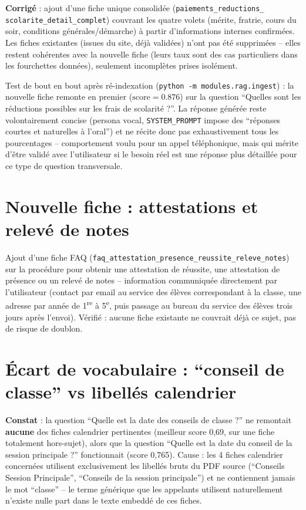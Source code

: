\documentclass[11pt,a4paper]{report}
\begin{document}
\textbf{Corrigé} : ajout d'une fiche unique consolidée (\texttt{paiements\_reductions\_}
\texttt{scolarite\_detail\_complet}) couvrant les quatre volets (mérite, fratrie, cours du
soir, conditions générales/démarche) à partir d'informations internes confirmées. Les
fiches existantes (issues du site, déjà validées) n'ont pas été supprimées -- elles
restent cohérentes avec la nouvelle fiche (leurs taux sont des cas particuliers dans les
fourchettes données), seulement incomplètes prises isolément.

\begin{noteinfo}
Test de bout en bout après ré-indexation (\texttt{python -m modules.rag.ingest}) : la
nouvelle fiche remonte en premier ($\text{score}=0.876$) sur la question ``Quelles sont
les réductions possibles sur les frais de scolarité ?''. La réponse générée reste
volontairement concise (persona vocal, \texttt{SYSTEM\_PROMPT} impose des ``réponses
courtes et naturelles à l'oral'') et ne récite donc pas exhaustivement tous les
pourcentages -- comportement voulu pour un appel téléphonique, mais qui mérite d'être
validé avec l'utilisateur si le besoin réel est une réponse plus détaillée pour ce type de
question transversale.
\end{noteinfo}

\section{Nouvelle fiche : attestations et relevé de notes}

Ajout d'une fiche FAQ (\texttt{faq\_attestation\_presence\_reussite\_releve\_notes}) sur
la procédure pour obtenir une attestation de réussite, une attestation de présence ou un
relevé de notes -- information communiquée directement par l'utilisateur (contact par
email au service des élèves correspondant à la classe, une adresse par année de
1\textsuperscript{re} à 5\textsuperscript{e}, puis passage au bureau du service des
élèves trois jours après l'envoi). Vérifié : aucune fiche existante ne couvrait déjà ce
sujet, pas de risque de doublon.

\section{Écart de vocabulaire : ``conseil de classe'' vs libellés calendrier}

\textbf{Constat} : la question ``Quelle est la date des conseils de classe ?'' ne
remontait \textbf{aucune} des fiches calendrier pertinentes (meilleur score 0{,}69, sur
une fiche totalement hors-sujet), alors que la question ``Quelle est la date du conseil
de la session principale ?'' fonctionnait (score 0{,}765). Cause : les 4 fiches
calendrier concernées utilisent exclusivement les libellés bruts du PDF source
(``Conseils Session Principale'', ``Conseils de la session principale'') et ne
contiennent jamais le mot ``classe'' -- le terme générique que les appelants utilisent
naturellement n'existe nulle part dans le texte embeddé de ces fiches.
\end{document}
